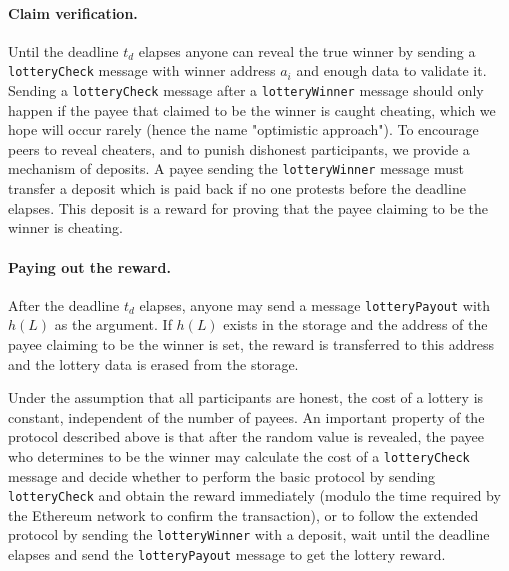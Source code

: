 \documentclass[a4paper]{article}
\begin{document}
    \paragraph{Claim verification.}
    Until the deadline $t_d$ elapses anyone can reveal the true winner by sending a \texttt{lotteryCheck} message with
    winner address $a_i$ and enough data to validate it. Sending a \texttt{lotteryCheck} message after a
    \texttt{lotteryWinner} message should only happen if the payee that claimed to be the winner is caught cheating,
    which we hope will occur rarely (hence the name "optimistic approach"). To encourage peers to reveal cheaters,
    and to punish dishonest participants, we provide a mechanism of deposits. A payee sending the \texttt{lotteryWinner}
    message must transfer a deposit which is paid back if no one protests before the deadline elapses.
    This deposit is a reward for proving that the payee claiming to be the winner is cheating.

    \paragraph{Paying out the reward.}
    After the deadline $t_d$ elapses, anyone may send a message \texttt{lotteryPayout} with $h(L)$ as the argument.
    If $h(L)$ exists in the storage and the address of the payee claiming to be the winner is set, the reward is
    transferred to this address and the lottery data is erased from the storage.

    Under the assumption that all participants are honest, the cost of a lottery is constant, independent of the number
    of payees.
    An important property of the protocol described above is that after the random value is revealed, the payee who
    determines to be the winner may calculate the cost of a \texttt{lotteryCheck} message and decide whether to perform
    the basic protocol by sending \texttt{lotteryCheck} and obtain the reward immediately (modulo the time required by
    the Ethereum network to confirm the transaction), or to follow the extended protocol by sending the
    \texttt{lotteryWinner} with a deposit, wait until the deadline elapses and send the \texttt{lotteryPayout} message
    to get the lottery reward.
\end{document}
